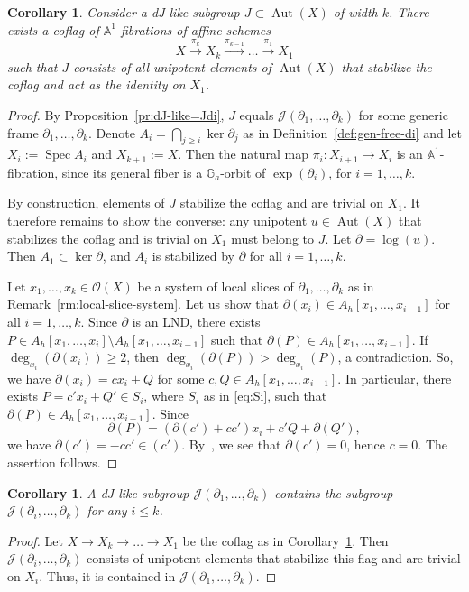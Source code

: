 \documentclass[12pt,a4paper]{amsart}
\theoremstyle{plain}
\newtheorem{corollary}[theorem]{Corollary}
\theoremstyle{definition}
\theoremstyle{remark}
\def\Aut{\operatorname{Aut}}
\def\Spec{\operatorname{Spec}}
\def\AA{{\mathbb A}}
\def\G{{\mathbb G}}
\def\cO{{\mathcal O}}
\def\J{{\mathcal J}}
\begin{document}
\begin{corollary}\label{cor:dJ-like-flag}
   Consider a dJ-like subgroup $J\subset\Aut(X)$ of width $k$. 
   There exists a coflag of $\AA^1$-fibrations of affine schemes
   \[
      X\stackrel{\pi_k}{\to} X_k\stackrel{\pi_{k-1}}{\to}\ldots\stackrel{\pi_1}{\to} X_1
   \]
   such that $J$ consists of all unipotent elements of $\Aut(X)$ that stabilize the coflag and act as the identity on $X_1$.
\end{corollary}
\begin{proof}
   By Proposition~\ref{pr:dJ-like=Jdi}, $J$ equals $\J(\partial_1,\ldots,\partial_k)$ for some generic frame $\partial_1,\ldots,\partial_k$. 
   Denote $A_i=\bigcap_{j\ge i}\ker \partial_j$ as in Definition~\ref{def:gen-free-di}
   and let $X_i:=\Spec A_i$ and $X_{k+1}:=X$.
   Then the natural map $\pi_i\colon X_{i+1}\to X_i$ is an $\AA^1$-fibration, since its general fiber is a $\G_a$-orbit of $\exp(\partial_i)$, for $i=1,\ldots,k$.

   By construction, elements of $J$ stabilize the coflag and are trivial on $X_1$.
    It therefore remains to show the converse: any unipotent $u\in\Aut(X)$ that stabilizes the coflag and is trivial on $X_1$ must belong to $J$.
   Let $\partial=\log(u)$. Then $A_1\subset \ker \partial$, and $A_i$ is stabilized by $\partial$ for all $i=1,\ldots,k$.

   Let $x_1,\ldots,x_k\in\cO(X)$ be a system of local slices of $\partial_1,\ldots,\partial_k$ as in Remark~\ref{rm:local-slice-system}.
   Let us show that $\partial(x_i)\in A_h[x_1,\ldots,x_{i-1}]$ for all $i=1,\ldots,k$.
   Since $\partial$ is an LND, there exists $P\in A_h[x_1,\ldots,x_i]\setminus A_h[x_1,\ldots,x_{i-1}]$ such that $\partial(P)\in A_h[x_1,\ldots,x_{i-1}]$.
   If $\deg_{x_i}(\partial(x_i))\ge2$, then $\deg_{x_i}(\partial(P))>\deg_{x_i}(P)$, a contradiction.
   So, we have $\partial(x_i)=c x_i + Q$ for some $c,Q\in A_h[x_1,\ldots,x_{i-1}]$.
   In particular, there exists $P=c'x_i+Q'\in S_i$, where $S_i$ as in \eqref{eq:Si}, such that $\partial(P)\in A_h[x_1,\ldots,x_{i-1}]$.
   Since  
   \[\partial(P)=(\partial(c')+cc')x_i+ c'Q+\partial(Q'),\]
we have $\partial(c')=-cc'\in (c')$. By~\cite[Principle~5]{Freudenburg}, we see that $\partial(c')=0$, hence $c=0$.
   The assertion follows.
\end{proof}

\begin{corollary}\label{cor:Ji-in-Jk}
   A dJ-like subgroup $\J(\partial_1,\ldots,\partial_k)$ contains the subgroup $\J(\partial_i,\ldots,\partial_k)$ for any $i\le k$.
\end{corollary}
\begin{proof}
   Let $X\to X_k\to\ldots\to X_1$ be the coflag as in Corollary~\ref{cor:dJ-like-flag}.
   Then $\J(\partial_i,\ldots,\partial_k)$ consists of unipotent elements that stabilize this flag and are trivial on $X_i$.
   Thus, it is contained in $\J(\partial_1,\ldots,\partial_k)$.
\end{proof}
\end{document}
